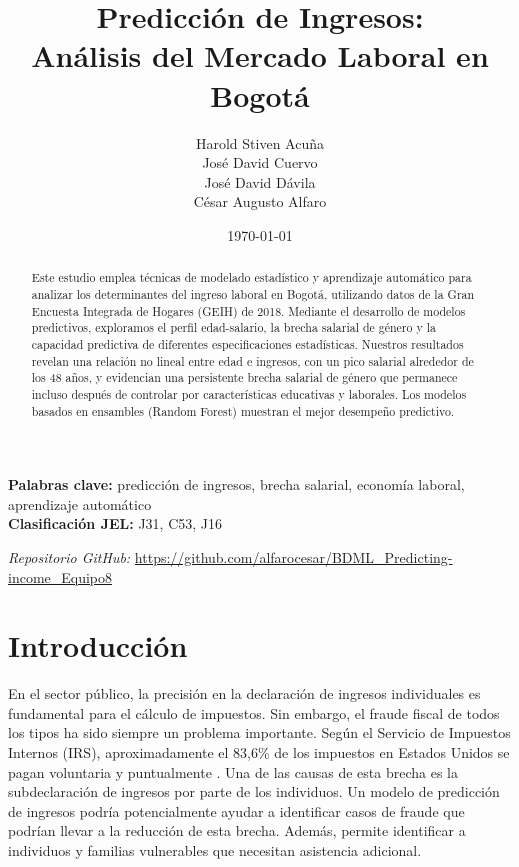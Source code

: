 \documentclass[12pt,a4paper,onecolumn]{article}
\title{Predicción de Ingresos: \\ Análisis del Mercado Laboral en Bogotá}
\author{%
\begin{center}
Harold Stiven Acuña\\
José David Cuervo\\
José David Dávila\\
César Augusto Alfaro
\end{center}%
}
\date{\today}
\begin{document}
\maketitle
\thispagestyle{empty}


\begin{abstract}
Este estudio emplea técnicas de modelado estadístico y aprendizaje automático para analizar los determinantes del ingreso laboral en Bogotá, utilizando datos de la Gran Encuesta Integrada de Hogares (GEIH) de 2018. Mediante el desarrollo de modelos predictivos, exploramos el perfil edad-salario, la brecha salarial de género y la capacidad predictiva de diferentes especificaciones estadísticas. Nuestros resultados revelan una relación no lineal entre edad e ingresos, con un pico salarial alrededor de los 48 años, y evidencian una persistente brecha salarial de género que permanece incluso después de controlar por características educativas y laborales. Los modelos basados en ensambles (Random Forest) muestran el mejor desempeño predictivo.
\end{abstract}

\medskip

\begin{flushleft}
    {\bf Palabras clave:} predicción de ingresos, brecha salarial, economía laboral, aprendizaje automático \\
    {\bf Clasificación JEL:} J31, C53, J16
\end{flushleft}

\begin{center}
    \textit{Repositorio GitHub:} \url{https://github.com/alfarocesar/BDML_Predicting-income_Equipo8}
\end{center}

\pagebreak
\doublespacing


\section{Introducción}
En el sector público, la precisión en la declaración de ingresos individuales es fundamental para el cálculo de impuestos. Sin embargo, el fraude fiscal de todos los tipos ha sido siempre un problema importante. Según el Servicio de Impuestos Internos (IRS), aproximadamente el 83,6\% de los impuestos en Estados Unidos se pagan voluntaria y puntualmente \citep{IRS2019}. Una de las causas de esta brecha es la subdeclaración de ingresos por parte de los individuos. Un modelo de predicción de ingresos podría potencialmente ayudar a identificar casos de fraude que podrían llevar a la reducción de esta brecha. Además, permite identificar a individuos y familias vulnerables que necesitan asistencia adicional.
\end{document}
